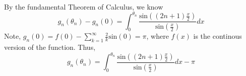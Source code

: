 \documentclass[letterpaper,12pt]{article}
\theoremstyle{definition}
\begin{document}
\\
By the fundamental Theorem of Calculus, we know
\[
g_n(\theta_n) - g_n(0) = \int^{\theta_n}_0 \frac{\text{sin} \left( (2n+1)\frac{x}{2} \right)}{\text{sin} (\frac{x}{2})} dx
\]
Note, $g_n(0) = f(0) - \sum^\infty_{k=1} \frac{2}{k} \text{sin}(0) = \pi$, where $f(x)$ is the continous version of the function.
Thus, 
\[
g_n(\theta_n) = \int^{\theta_n}_0 \frac{\text{sin} \left( (2n+1)\frac{x}{2} \right)}{\text{sin} (\frac{x}{2})} dx - \pi
\]
\end{document}
